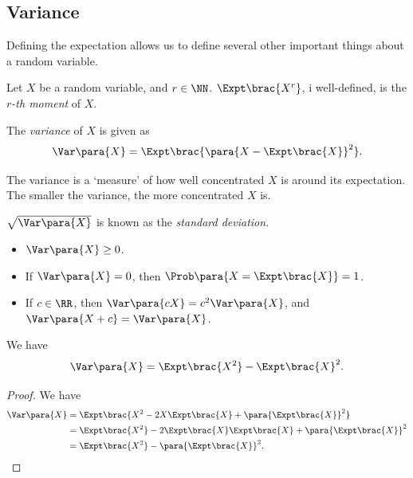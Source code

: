 \subsection{Variance}

Defining the expectation allows us to define several other important things about a random variable.

\begin{definition}[Moment]
    \label{def:moment}%
    Let \(X\) be a random variable, and \(r \in \NN\). \(\Expt\brac{X^r}\), i well-defined, is the \emph{\(r\)-th moment} of \(X\).
\end{definition}

\begin{definition}[Variance]
    \label{def:variance}%
    The \emph{variance} of \(X\) is given as
    \[
        \Var\para{X} = \Expt\brac{\para{X - \Expt\brac{X}}^2}.
    \]
\end{definition}

The variance is a `measure' of how well concentrated \(X\) is around its expectation. The smaller the variance, the more concentrated \(X\) is.

\begin{definition}
    \label{def:std-deviation}%
    \(\sqrt{\Var\para{X}}\) is known as the \emph{standard deviation}.
\end{definition}

\begin{proposition}
    \label{prop:properties-of-variance}%
    \begin{itemize}
        \item \(\Var\para{X} \geq 0\).
        \item If \(\Var\para{X} = 0\), then \(\Prob\para{X = \Expt\brac{X}} = 1\).
        \item If \(c \in \RR\), then \(\Var\para{cX} = c^2 \Var\para{X}\), and \(\Var\para{X + c} = \Var\para{X}\).
    \end{itemize}
\end{proposition}

\begin{proposition}
    \label{prop:alt-formulation}%
    We have
    \[
        \Var\para{X} = \Expt\brac{X^2} - \Expt\brac{X}^2.
    \]
\end{proposition}

\begin{proof}
    We have
    \begin{align*}
        \Var\para{X} &= \Expt\brac{X^2 - 2X \Expt\brac{X} + \para{\Expt\brac{X}}^2} \\
        &= \Expt\brac{X^2} - 2 \Expt\brac{X} \Expt\brac{X} + \para{\Expt\brac{X}}^2 \\
        &= \Expt\brac{X^2} - \para{\Expt\brac{X}}^2.
    \end{align*}
\end{proof}

